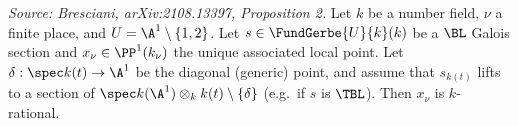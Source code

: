 
\begin{proposition}[SimpleProp]
  \label{prop:simple}
  \textit{Source: Bresciani, arXiv:2108.13397, Proposition 2.}
  Let \(k\) be a number field, \(\nu\) a finite place, and \(U = \A^1 \setminus \{1,2\}\).
  Let \(s \in \FundGerbe{U}{k}(k)\) be a \(\BL\) Galois section and
  \(x_\nu \in \PP^1(k_\nu)\) the unique associated local point. Let
  \(\delta : \spec k(t) \to \A^1\) be the diagonal (generic) point, and assume that
  \(s_{k(t)}\) lifts to a section of
  \(\spec k(\A^1) \otimes_k k(t) \setminus \{\delta\}\) (e.g.\ if \(s\) is \(\TBL\)).
  Then \(x_\nu\) is \(k\)-rational.
\end{proposition}

